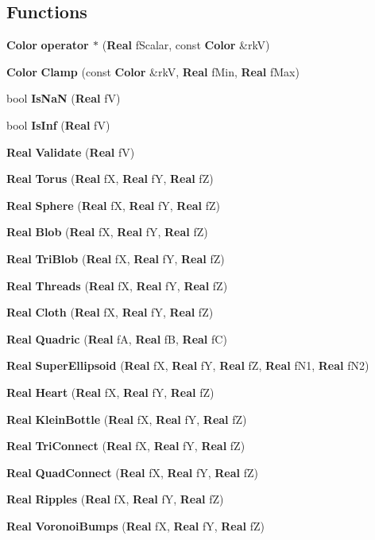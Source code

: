 \subsection*{Functions}
\begin{CompactItemize}
\item 
{\bf Color} {\bf operator $\ast$} ({\bf Real} f\-Scalar, const {\bf Color} \&rk\-V)
\item 
{\bf Color} {\bf Clamp} (const {\bf Color} \&rk\-V, {\bf Real} f\-Min, {\bf Real} f\-Max)
\item 
bool {\bf Is\-Na\-N} ({\bf Real} f\-V)
\item 
bool {\bf Is\-Inf} ({\bf Real} f\-V)
\item 
{\bf Real} {\bf Validate} ({\bf Real} f\-V)
\item 
{\bf Real} {\bf Torus} ({\bf Real} f\-X, {\bf Real} f\-Y, {\bf Real} f\-Z)
\item 
{\bf Real} {\bf Sphere} ({\bf Real} f\-X, {\bf Real} f\-Y, {\bf Real} f\-Z)
\item 
{\bf Real} {\bf Blob} ({\bf Real} f\-X, {\bf Real} f\-Y, {\bf Real} f\-Z)
\item 
{\bf Real} {\bf Tri\-Blob} ({\bf Real} f\-X, {\bf Real} f\-Y, {\bf Real} f\-Z)
\item 
{\bf Real} {\bf Threads} ({\bf Real} f\-X, {\bf Real} f\-Y, {\bf Real} f\-Z)
\item 
{\bf Real} {\bf Cloth} ({\bf Real} f\-X, {\bf Real} f\-Y, {\bf Real} f\-Z)
\item 
{\bf Real} {\bf Quadric} ({\bf Real} f\-A, {\bf Real} f\-B, {\bf Real} f\-C)
\item 
{\bf Real} {\bf Super\-Ellipsoid} ({\bf Real} f\-X, {\bf Real} f\-Y, {\bf Real} f\-Z, {\bf Real} f\-N1, {\bf Real} f\-N2)
\item 
{\bf Real} {\bf Heart} ({\bf Real} f\-X, {\bf Real} f\-Y, {\bf Real} f\-Z)
\item 
{\bf Real} {\bf Klein\-Bottle} ({\bf Real} f\-X, {\bf Real} f\-Y, {\bf Real} f\-Z)
\item 
{\bf Real} {\bf Tri\-Connect} ({\bf Real} f\-X, {\bf Real} f\-Y, {\bf Real} f\-Z)
\item 
{\bf Real} {\bf Quad\-Connect} ({\bf Real} f\-X, {\bf Real} f\-Y, {\bf Real} f\-Z)
\item 
{\bf Real} {\bf Ripples} ({\bf Real} f\-X, {\bf Real} f\-Y, {\bf Real} f\-Z)
\item 
{\bf Real} {\bf Voronoi\-Bumps} ({\bf Real} f\-X, {\bf Real} f\-Y, {\bf Real} f\-Z)
\item 

\end{CompactItemize}
